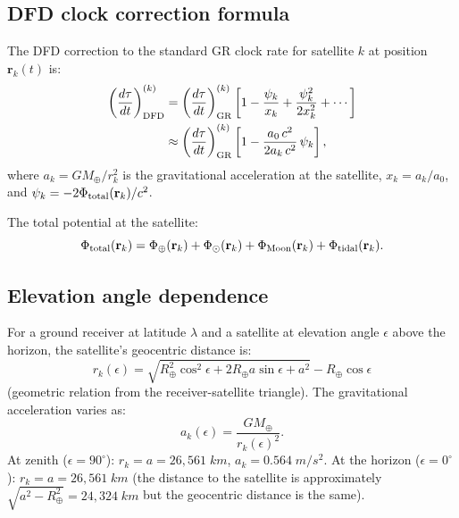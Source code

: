 \documentclass[aps,prd,twocolumn,superscriptaddress,nofootinbib,longbibliography]{revtex4-2}
\begin{document}
\subsection{DFD clock correction formula}\label{sec:clock-correction}

The DFD correction to the standard GR clock rate for satellite $k$ at
position $\mathbf{r}_k(t)$ is:
\begin{align}\label{eq:DFD-clock-full}
\left(\frac{d\tau}{dt}\right)_{\rm DFD}^{(k)} &= \left(\frac{d\tau}{dt}\right)_{\rm GR}^{(k)}
\left[1 - \frac{\psi_k}{x_k} + \frac{\psi_k^2}{2x_k^2} + \cdots\right] \nonumber\\
&\approx \left(\frac{d\tau}{dt}\right)_{\rm GR}^{(k)}
\left[1 - \frac{a_0\,c^2}{2a_k\,c^2}\,\psi_k\right],
\end{align}
where $a_k = GM_\oplus/r_k^2$ is the gravitational acceleration at the
satellite, $x_k = a_k/a_0$, and
$\psi_k = -2\Phi_{\rm total}(\mathbf{r}_k)/c^2$.

The total potential at the satellite:
\begin{equation}\label{eq:Phi-total}
\Phi_{\rm total}(\mathbf{r}_k) = \Phi_\oplus(\mathbf{r}_k) + \Phi_\odot(\mathbf{r}_k)
+ \Phi_{\rm Moon}(\mathbf{r}_k) + \Phi_{\rm tidal}(\mathbf{r}_k).
\end{equation}

\subsection{Elevation angle dependence}\label{sec:elevation}

For a ground receiver at latitude $\lambda$ and a satellite at
elevation angle $\epsilon$ above the horizon, the satellite's
geocentric distance is:
\begin{equation}
r_k(\epsilon) = \sqrt{R_\oplus^2\cos^2\epsilon + 2R_\oplus a\sin\epsilon + a^2} - R_\oplus\cos\epsilon
\end{equation}
(geometric relation from the receiver-satellite triangle). The
gravitational acceleration varies as:
\begin{equation}
a_k(\epsilon) = \frac{GM_\oplus}{r_k(\epsilon)^2}.
\end{equation}
At zenith ($\epsilon = 90^\circ$): $r_k = a = 26{,}561\;\si{km}$,
$a_k = 0.564\;\si{m/s^2}$.
At the horizon ($\epsilon = 0^\circ$): $r_k = a = 26{,}561\;\si{km}$
(the distance to the satellite is approximately $\sqrt{a^2 - R_\oplus^2}
= 24{,}324\;\si{km}$ but the geocentric distance is the same).
\end{document}
